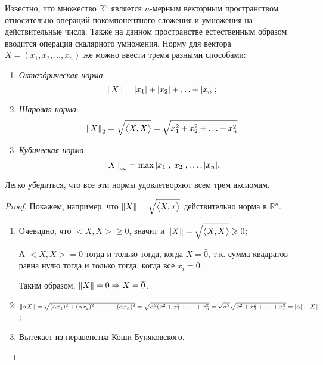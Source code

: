 \begin{definition}
	Известно, что множество $\mathbb{R}^n$ является $n$-мерным векторным пространством относительно операций покомпонентного сложения и умножения на действительные числа. Также на данном пространстве естественным образом вводится операция скалярного умножения. Норму для вектора $X = (x_1, x_2, \dotsc, x_n)$ же можно ввести тремя разными способами:
	\begin{enumerate}
		\item \textit{Октаэдрическая норма}: 
		\begin{equation*}
			\norm{X} = \abs{x_1} + \abs{x_2} + \dotsc + \abs{x_n};
		\end{equation*}
		
		\item \textit{Шаровая норма}: \begin{equation*}
			\norm{X}_2 = \sqrt{\big<X, X\big>} = \sqrt{x_1^2 + x_2^2 + \dotsc + x_n^2}
		\end{equation*}
		
		\item \textit{Кубическая норма}:
		\begin{equation*}
			\norm{X}_{\infty} = \max{\abs{x_1}, \abs{x_2}, \dotsc, \abs{x_n}}.
		\end{equation*}
	\end{enumerate}
	
\end{definition}
\begin{utv}
	Легко убедиться, что все эти нормы удовлетворяют всем трем аксиомам.
\end{utv}
\begin{proof}
	Покажем, например, что $\norm{X} = \sqrt{\big<X, x\big>}$ действительно норма в $\mathbb{R}^n$.
	\begin{enumerate}
		\item Очевидно, что $\big<X, X\big> \geqslant 0$, значит и $\norm{X} = \sqrt{\big<X, X\big>} \geqslant 0$;
		
		А $\big<X, X\big> = 0$ тогда и только тогда, когда $X = \bar{0}$, т.к. сумма квадратов равна нулю тогда и только тогда, когда все $x_i = 0$.
		
		Таким образом, $\norm{X} = 0 \Rightarrow X = \bar{0}$.
		
		\item $\norm{\alpha X} = \sqrt{(\alpha x_1)^2 + (\alpha x_2)^2 + \dotsc + (\alpha x_n)^2} = \sqrt{\alpha^2 (x_1^2 + x_2^2 + \dotsc + x_n^2} = \sqrt{\alpha^2} \sqrt{x_1^2 + x_2^2 + \dotsc + x_n^2} = \abs{\alpha} \cdot \norm{X}$;
		
		\item Вытекает из неравенства Коши-Буняковского.
	\end{enumerate}
\end{proof}

